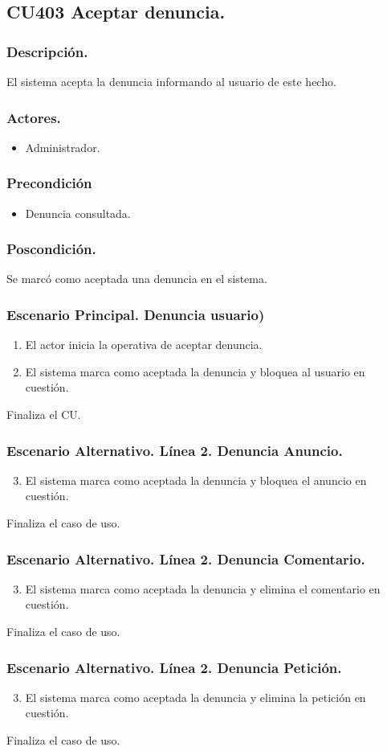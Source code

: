 \subsection{CU403 Aceptar denuncia.}
\subsubsection{Descripci\'{o}n.}
El sistema acepta la denuncia informando al usuario de este hecho.
\subsubsection{Actores.}
\begin{itemize}
\item Administrador.
\end{itemize}
\subsubsection{Precondici\'{o}n}
\begin{itemize}
\item Denuncia consultada.
\end{itemize}
\subsubsection{Poscondici\'{o}n.}
Se marc\'{o} como aceptada una denuncia en el sistema.
\subsubsection{Escenario Principal. Denuncia usuario)}
\begin{enumerate}
\item El actor inicia la operativa de aceptar denuncia.
\item El sistema marca como aceptada la denuncia y bloquea al usuario en cuesti\'{o}n.
\end{enumerate}
Finaliza el CU.
\subsubsection{Escenario Alternativo. L\'{i}nea 2. Denuncia Anuncio.}
\begin{enumerate}
\setcounter{enumi}{2}
\item El sistema marca como aceptada la denuncia y bloquea el anuncio en cuesti\'{o}n.
\end{enumerate}
Finaliza el caso de uso.
\subsubsection{Escenario Alternativo. L\'{i}nea 2. Denuncia Comentario.}
\begin{enumerate}
\setcounter{enumi}{2}
\item El sistema marca como aceptada la denuncia y elimina el comentario en cuesti\'{o}n.
\end{enumerate}
Finaliza el caso de uso.
\subsubsection{Escenario Alternativo. L\'{i}nea 2. Denuncia Petici\'{o}n.}
\begin{enumerate}
\setcounter{enumi}{2}
\item El sistema marca como aceptada la denuncia y elimina la petici\'{o}n en cuesti\'{o}n.
\end{enumerate}
Finaliza el caso de uso.